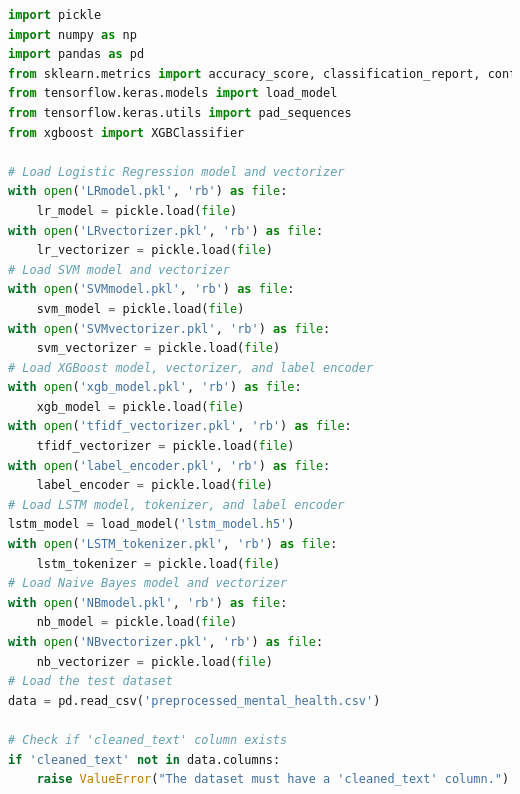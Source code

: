 \begin{tcolorbox}[colback=gray!5!white, colframe=gray!80!black, boxrule=0.5pt, title=Evaluate Meta-Learner and Ensemble Model 2]
    \begin{lstlisting}[language=Python]
import pickle
import numpy as np
import pandas as pd
from sklearn.metrics import accuracy_score, classification_report, confusion_matrix
from tensorflow.keras.models import load_model
from tensorflow.keras.utils import pad_sequences
from xgboost import XGBClassifier

# Load Logistic Regression model and vectorizer
with open('LRmodel.pkl', 'rb') as file:
    lr_model = pickle.load(file)
with open('LRvectorizer.pkl', 'rb') as file:
    lr_vectorizer = pickle.load(file)
# Load SVM model and vectorizer
with open('SVMmodel.pkl', 'rb') as file:
    svm_model = pickle.load(file)
with open('SVMvectorizer.pkl', 'rb') as file:
    svm_vectorizer = pickle.load(file)
# Load XGBoost model, vectorizer, and label encoder
with open('xgb_model.pkl', 'rb') as file:
    xgb_model = pickle.load(file)
with open('tfidf_vectorizer.pkl', 'rb') as file:
    tfidf_vectorizer = pickle.load(file)
with open('label_encoder.pkl', 'rb') as file:
    label_encoder = pickle.load(file)
# Load LSTM model, tokenizer, and label encoder
lstm_model = load_model('lstm_model.h5')
with open('LSTM_tokenizer.pkl', 'rb') as file:
    lstm_tokenizer = pickle.load(file)
# Load Naive Bayes model and vectorizer
with open('NBmodel.pkl', 'rb') as file:
    nb_model = pickle.load(file)
with open('NBvectorizer.pkl', 'rb') as file:
    nb_vectorizer = pickle.load(file)
# Load the test dataset
data = pd.read_csv('preprocessed_mental_health.csv')

# Check if 'cleaned_text' column exists
if 'cleaned_text' not in data.columns:
    raise ValueError("The dataset must have a 'cleaned_text' column.")
\end{lstlisting}
\end{tcolorbox}
 

